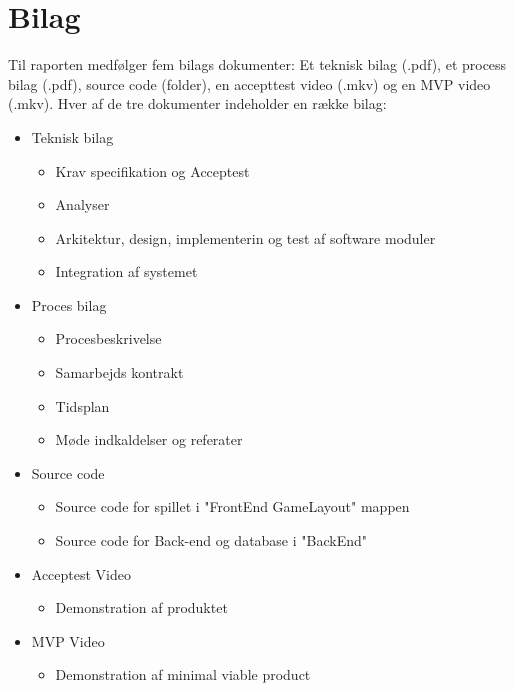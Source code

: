 \section{Bilag}

Til raporten medfølger fem bilags dokumenter: Et teknisk bilag (.pdf), et process bilag (.pdf), source code (folder), en accepttest video (.mkv) og en MVP video (.mkv). Hver af de tre dokumenter indeholder en række bilag:

\begin{itemize}
\item Teknisk bilag
	\begin{itemize}
	\item Krav specifikation og Acceptest
	\item Analyser
	\item Arkitektur, design, implementerin og test af software moduler
	\item Integration af systemet
	\end{itemize}

\item Proces bilag
	\begin{itemize}
	\item Procesbeskrivelse
	\item Samarbejds kontrakt
	\item Tidsplan
	\item Møde indkaldelser og referater
	\end{itemize}

\item Source code
	\begin{itemize}
	\item Source code for spillet i "FrontEnd GameLayout" mappen
	\item Source code for Back-end og database i "BackEnd"
	\end{itemize}

\item Acceptest Video
	\begin{itemize}
	\item Demonstration af produktet
	\end{itemize}
	
\item MVP Video
	\begin{itemize}
	\item Demonstration af minimal viable product
	\end{itemize}
\end{itemize}